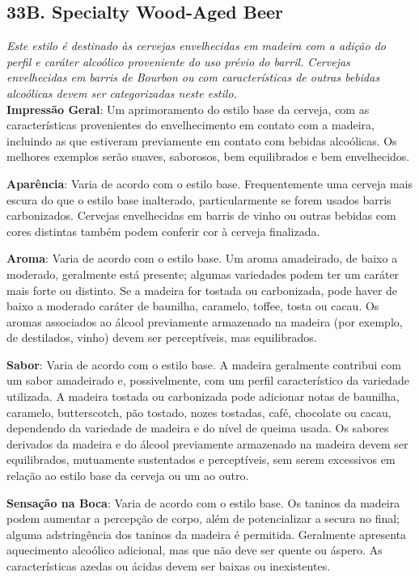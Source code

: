 \subsection*{33B. Specialty Wood-Aged Beer}
\textit{Este estilo é destinado às cervejas envelhecidas em madeira com a adição do perfil e caráter alcoólico proveniente do uso prévio do barril. Cervejas envelhecidas em barris de Bourbon ou com características de outras bebidas alcoólicas devem ser categorizadas neste estilo.}\\
\textbf{Impressão Geral}: Um aprimoramento do estilo base da cerveja, com as características provenientes do envelhecimento em contato com a madeira, incluindo as que estiveram previamente em contato com bebidas alcoólicas. Os melhores exemplos serão suaves, saborosos, bem equilibrados e bem envelhecidos.

\textbf{Aparência}: Varia de acordo com o estilo base. Frequentemente uma cerveja mais escura do que o estilo base inalterado, particularmente se forem usados barris carbonizados. Cervejas envelhecidas em barris de vinho ou outras bebidas com cores distintas também podem conferir cor à cerveja finalizada.

\textbf{Aroma}: Varia de acordo com o estilo base. Um aroma amadeirado, de baixo a moderado, geralmente está presente; algumas variedades podem ter um caráter mais forte ou distinto. Se a madeira for tostada ou carbonizada, pode haver de baixo a moderado caráter de baunilha, caramelo, toffee, tosta ou cacau. Os aromas associados ao álcool previamente armazenado na madeira (por exemplo, de destilados, vinho) devem ser perceptíveis, mas equilibrados.

\textbf{Sabor}: Varia de acordo com o estilo base. A madeira geralmente contribui com um sabor amadeirado e, possivelmente, com um perfil característico da variedade utilizada. A madeira tostada ou carbonizada pode adicionar notas de baunilha, caramelo, butterscotch, pão tostado, nozes tostadas, café, chocolate ou cacau, dependendo da variedade de madeira e do nível de queima usada. Os sabores derivados da madeira e do álcool previamente armazenado na madeira devem ser equilibrados, mutuamente sustentados e perceptíveis, sem serem excessivos em relação ao estilo base da cerveja ou um ao outro.

\textbf{Sensação na Boca}: Varia de acordo com o estilo base. Os taninos da madeira podem aumentar a percepção de corpo, além de potencializar a secura no final; alguma adstringência dos taninos da madeira é permitida. Geralmente apresenta aquecimento alcoólico adicional, mas que não deve ser quente ou áspero. As características azedas ou ácidas devem ser baixas ou inexistentes.

